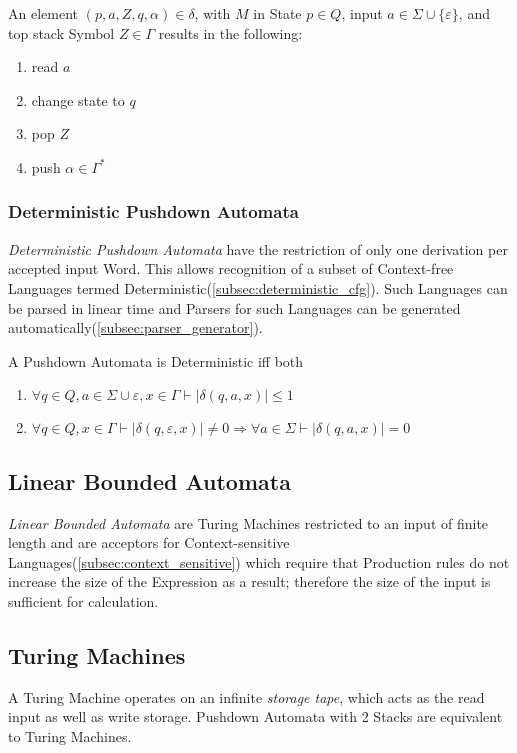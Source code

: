 \documentclass{article}
\begin{document}
An element $(p,a,Z,q,\alpha)\in\delta$, with $M$ in State $p \in Q$,
input $a \in \Sigma \cup \{\varepsilon\}$, and top stack Symbol $Z \in
\Gamma$ results in the following:
\begin{enumerate}
\item read $a$
\item change state to $q$
\item pop $Z$
\item push $\alpha \in \Gamma^*$
\end{enumerate}

\subsubsection{Deterministic Pushdown Automata}\label{subsec:deterministic_pda}
\emph{Deterministic Pushdown Automata} have the restriction of only
one derivation per accepted input Word. This allows recognition of a
subset of Context-free Languages termed
Deterministic(\ref{subsec:deterministic_cfg}). Such Languages can be
parsed in linear time and Parsers for such Languages can be generated
automatically(\ref{subsec:parser_generator}).

A Pushdown Automata is Deterministic iff both
\begin{enumerate}
\item $\forall q \in Q, a \in \Sigma \cup {\varepsilon}, x \in
  \Gamma \vdash |\delta(q,a,x)| \leq 1$
\item $\forall q \in Q, x \in \Gamma \vdash |\delta(q,\varepsilon,x)|
  \neq 0 \Rightarrow \forall a \in \Sigma \vdash |\delta(q,a,x)|=0$
\end{enumerate}

\subsection{Linear Bounded Automata} \label{subsec:linear_bounded_automata}
\emph{Linear Bounded Automata} are Turing Machines restricted to an
input of finite length and are acceptors for Context-sensitive
Languages(\ref{subsec:context_sensitive}) which require that
Production rules do not increase the size of the Expression as a
result; therefore the size of the input is sufficient for calculation.

\subsection{Turing Machines}\label{subsec:turing_machine}
A Turing Machine operates on an infinite \emph{storage tape}, which
acts as the read input as well as write storage. Pushdown Automata
with 2 Stacks are equivalent to Turing Machines.
\end{document}
